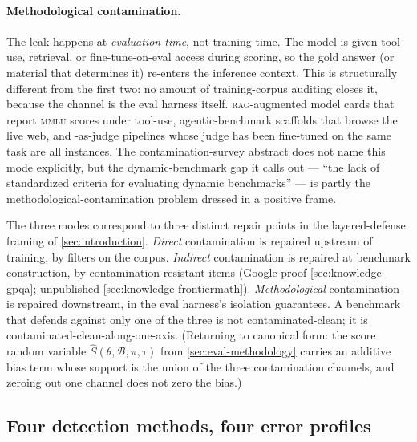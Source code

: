\paragraph{Methodological contamination.} The leak happens at
\emph{evaluation time}, not training time. The model is given
tool-use, retrieval, or fine-tune-on-eval access during scoring, so
the gold answer (or material that determines it) re-enters the inference
context. This is structurally different from the first two: no
amount of training-corpus auditing closes it, because the channel is
the eval harness itself. \textsc{rag}-augmented model cards that
report \textsc{mmlu} scores under tool-use, agentic-benchmark
scaffolds that browse the live web, and \textsc{}-as-judge
pipelines whose judge has been fine-tuned on the same task are all
instances. The contamination-survey abstract does not name this mode
explicitly, but the dynamic-benchmark gap it calls out --- ``the lack
of standardized criteria for evaluating dynamic benchmarks''
\citep[\S{}abstract]{contamination-survey-2025} --- is partly the
methodological-contamination problem dressed in a positive frame.

\begin{intuition}
The three modes correspond to three distinct repair points in the
layered-defense framing of \cref{sec:introduction}. \emph{Direct}
contamination is repaired upstream of training, by 
filters on the corpus. \emph{Indirect} contamination is repaired at
benchmark construction, by contamination-resistant items (Google-proof
\cref{sec:knowledge-gpqa}; unpublished \cref{sec:knowledge-frontiermath}).
\emph{Methodological} contamination is repaired downstream, in the
eval harness's isolation guarantees. A benchmark that defends against
only one of the three is not contaminated-clean; it is
contaminated-clean-along-one-axis. (Returning to canonical form: the
score random variable $\hat{S}(\theta, \mathcal{B}, \pi, \tau)$ from
\cref{sec:eval-methodology} carries an additive bias term whose
support is the union of the three contamination channels, and zeroing
out one channel does not zero the bias.)
\end{intuition}

\subsection{Four detection methods, four error profiles}
\label{sec:contamination-detection}

